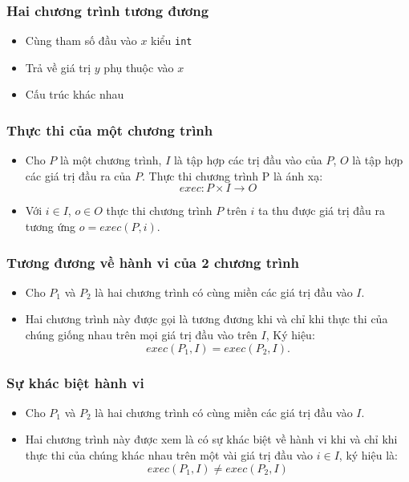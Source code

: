 \documentclass{beamer}
\begin{document}
\begin{frame}
  \frametitle{Hai chương trình tương đương}
  \begin{minipage}[t]{0.45\linewidth}
    
  \end{minipage}
  \hfill\vrule\hfill
  \begin{minipage}[t]{0.45\linewidth}
    
  \end{minipage}
  \begin{itemize}
  \item Cùng tham số đầu vào $ x $ kiểu \texttt{int}
  \item Trả về giá trị $ y $ phụ thuộc vào $ x $
  \item Cấu trúc khác nhau
  \end{itemize}
\end{frame}


\begin{frame}
  \frametitle{Thực thi của một chương trình}
  \begin{itemize}
  	\item Cho $P$ là một chương trình, $I$ là tập hợp các trị đầu vào của $P$, 
  	$O$ là tập hợp các giá trị đầu ra của $P$. 
  	Thực thi chương trình P là ánh xạ: 
  	\[exec: P \times I \rightarrow O\]
  	\item Với $i \in I$, $o \in O$ thực thi chương trình $P$ trên
  	$i$ ta thu được giá trị đầu ra tương ứng $o = exec(P, i)$.
  \end{itemize}  
\end{frame}


\begin{frame}
  \frametitle{Tương đương về hành vi của 2 chương trình}
  \begin{itemize}
  	\item Cho $P_{1}$ và $P_{2}$ là hai chương trình có cùng miền các giá trị
  	đầu vào $I$. 
  	\item Hai chương trình này được gọi là tương đương khi và chỉ
  	khi thực thi của chúng giống nhau trên mọi giá trị đầu vào trên $I$,
  	Ký hiệu: \[exec(P_{1}, I) = exec(P_{2}, I).\]
  \end{itemize}
 
\end{frame}


\begin{frame}
  \frametitle{Sự khác biệt hành vi}
  \begin{itemize}
  	\item Cho $P_{1}$ và $P_{2}$ là hai chương trình có cùng miền các giá trị
  	đầu vào $I$. 
  	\item Hai chương trình này được xem là có sự khác biệt về
  	hành vi khi và chỉ khi thực thi của chúng khác nhau trên một vài giá
  	trị đầu vào $i \in I$, ký hiệu là: \[exec(P_{1}, I) \neq exec(P_{2}, I)\]
  \end{itemize}

\end{frame}
\end{document}
